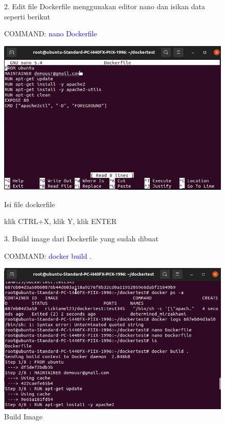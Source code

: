 \begin{figure}
2. Edit file Dockerfile menggunakan editor nano dan isikan data seperti berikut 

COMMAND: \textcolor{Blue}{nano Dockerfile}
    \begin{center}
        \includegraphics[width=\linewidth]{image/21.jpg}
        \caption{Isi file dockerfile}
        \label{fig:my_figure}
    \end{center}

    klik CTRL+X, klik Y, klik ENTER


    3. Build image dari Dockerfile yang sudah dibuat 

COMMAND: \textcolor{Blue}{docker build .}
    \begin{center}
        \includegraphics[width=\linewidth]{image/22.jpg}
        \caption{Build Image}
        \label{fig:my_figure}
    \end{center}
\end{figure}

